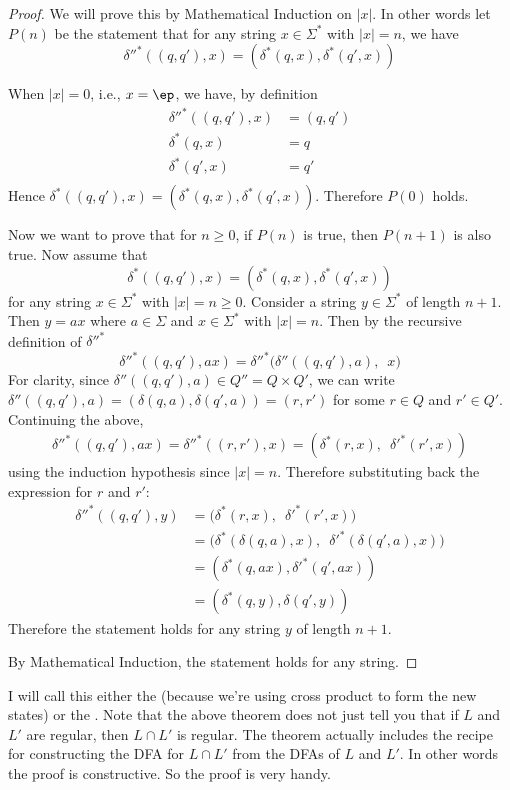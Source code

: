 \begin{proof}
We will prove this by Mathematical Induction on $|x|$.
In other words let $P(n)$ be the statement that for any
string $x \in \Sigma^*$ with $|x| = n$, we have
\[
 \delta''^*((q,q'),x) = (\delta^*(q,x), \delta^*(q',x))
\]

When $|x| = 0$, i.e., $x = \ep$, we have, by definition
\begin{align*}
 \delta''^*((q,q'),x) &= (q,q') \\
 \delta^*(q,x) &= q \\
 \delta^*(q',x) &= q' \\
\end{align*}
Hence $\delta^*((q,q'),x) = (\delta^*(q,x), \delta^*(q',x))$.
Therefore $P(0)$ holds.

Now we want to prove that for $n \geq 0$, if $P(n)$ is true,
then $P(n+1)$ is also true.
Now assume that
\[
 \delta^*((q,q'),x) = (\delta^*(q,x), \delta^*(q',x))
\]
for any string $x \in \Sigma^*$ with $|x| = n
\geq 0$. Consider a string $y\in\Sigma^*$ of length $n+1$. Then $y
= ax$ where $a \in \Sigma$ and $x \in \Sigma^*$ with $|x| = n$.
Then by the recursive definition of $\delta''^*$
\[
\delta''^*((q,q'),ax)
 = \delta''^*\biggl( \delta''((q,q'),a), \,\,\, x\biggr)
\]
For clarity, since $\delta''((q,q'),a) \in Q'' = Q \times Q'$, we
can write $\delta''((q,q'),a) = (\delta(q,a), \delta(q',a)) =
(r,r')$ for some $r \in Q$ and $r' \in Q'$. Continuing the above,
\begin{align*}
\delta''^*((q,q'),ax)
 = \delta''^* ( (r,r'), x )
 = (\delta^*(r,x), \,\,\, \delta'^*(r',x) )
\end{align*}
using the induction hypothesis since $|x| = n$.
 Therefore substituting back the expression for $r$ and $r'$:
\begin{align*}
\delta''^*((q,q'),y)
 &= \biggl(\delta^*(r,x), \,\,\, \delta'^*(r',x) \biggr) \\
 &= \biggl( \delta^*(\delta(q,a),x), \,\,\, \delta'^*(\delta(q',a),x) \biggr) \\
 &= ( \delta^*(q,ax), \delta'^*(q',ax) ) \\
 &= ( \delta^*(q,y),\delta(q',y) )
\end{align*}
Therefore the statement holds for any string $y$ of length $n+1$.

By Mathematical Induction, the statement holds for any string.
\end{proof}

I will call this either the  
(because we're using cross product to form the new states) or the 
.
Note that the above theorem does not just tell you that
if $L$ and $L'$ are regular, then $L \cap L'$ is regular.
The theorem actually includes the recipe for constructing
the DFA for $L \cap L'$ from the DFAs of $L$ and $L'$.
In other words the proof is constructive.
So the proof is very handy.

